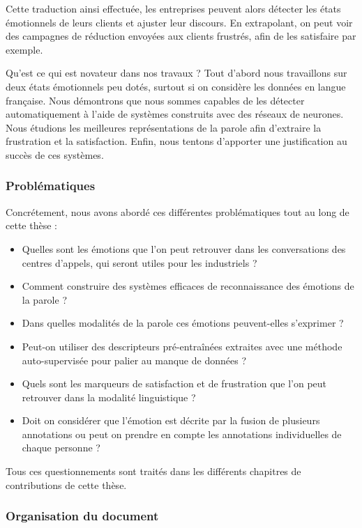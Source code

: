 Cette traduction ainsi effectuée, les entreprises peuvent alors détecter les états émotionnels de leurs clients et ajuster leur discours. En extrapolant, on peut voir des campagnes de réduction envoyées aux clients frustrés, afin de les satisfaire par exemple.

Qu'est ce qui est novateur dans nos travaux ? Tout d'abord nous travaillons sur deux états émotionnels peu dotés, surtout si on considère les données en langue française. Nous démontrons que nous sommes capables de les détecter automatiquement à l'aide de systèmes construits avec des réseaux de neurones. Nous étudions les meilleures représentations de la parole afin d'extraire la frustration et la satisfaction. Enfin, nous tentons d'apporter une justification au succès de ces systèmes.

\subsubsection{Problématiques}
Concrétement, nous avons abordé ces différentes problématiques tout au long de cette thèse :
\begin{itemize}
  \item Quelles sont les émotions que l'on peut retrouver dans les conversations des centres d'appels, qui seront utiles pour les industriels ?
  \item Comment construire des systèmes efficaces de reconnaissance des émotions de la parole ?
  \item Dans quelles modalités de la parole ces émotions peuvent-elles s'exprimer ?
  \item Peut-on utiliser des descripteurs pré-entraînées extraites avec une méthode auto-supervisée pour palier au manque de données ?
  \item Quels sont les marqueurs de satisfaction et de frustration que l'on peut retrouver dans la modalité linguistique ?
  \item Doit on considérer que l'émotion est décrite par la fusion de plusieurs annotations ou peut on prendre en compte les annotations individuelles de chaque personne ?
\end{itemize}

Tous ces questionnements sont traités dans les différents chapitres de contributions de cette thèse.

\subsubsection{Organisation du document}

